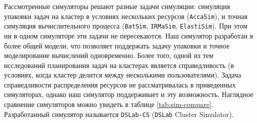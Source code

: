 Рассмотренные симуляторы решают разные задачи симуляции: симуляция упаковки задач на кластер в условиях нескольких ресурсов (\texttt{AccaSim}), и точная симуляция вычислительного процесса (\texttt{BatSim}, \texttt{IRMaSim}, \texttt{ElastiSim}). При этом ни в одном симуляторе эти задачи не пересекаются. Наш симулятор разработан в более общей модели, что позволяет поддержать задачу упаковки и точное моделирование вычислений одновременно. Более того, одной из тем исследований планирования задач на кластерах является справедливость (в условиях, когда кластер делится между несколькими пользователями). Задача справедливости распределения ресурсов не рассматривалась в приведенных симуляторах, однако наш симулятор поддерживает и эту возможность. Наглядное сравнение симуляторов можно увидеть в таблице \ref{tab:sim-compare}. Разработанный симулятор называется \texttt{DSLab-CS} (\texttt{DSLab} Cluster Simulator).

